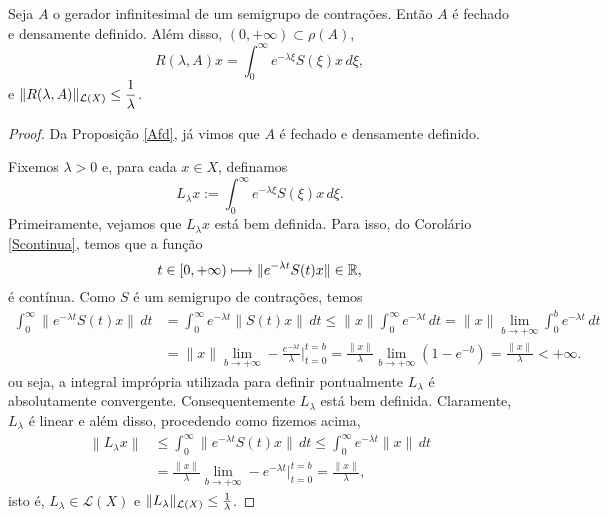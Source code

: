 \begin{lemma}
Seja $A$ o gerador infinitesimal de um semigrupo de contrações. Então $A$ é fechado e densamente definido. Além disso, $(0,+\infty)\subset \rho(A)$, 
\[R(\lambda,A)x=\displaystyle\int_0^\infty e^{-\lambda \xi}S(\xi)x\, d\xi,\] 
e $\|R(\lambda, A)\|_{\mathcal{L}(X)}\leq \displaystyle\frac{1}{\lambda}$.
\end{lemma}
\begin{proof} Da Proposição \ref{Afd}, já vimos que $A$ é fechado e densamente definido.

Fixemos $\lambda>0$ e, para cada $x\in X$, definamos
\begin{equation*}
L_\lambda x :=\int_0^\infty e^{-\lambda \xi}S(\xi)x\, d\xi.
\end{equation*}
Primeiramente, vejamos que $L_\lambda x$ {está bem definida.} 
Para isso, %
do Corolário \ref{Scontinua}, temos que a função
\begin{equation*}
t \in [0,+\infty) \longmapsto
\| e^{-\lambda t}S(t)x\|\in  \mathbb{R},
\end{equation*}
é contínua. 
Como $S$ é um semigrupo de contrações, temos
\begin{align*}
\int_0^\infty \|e^{-\lambda t}S(t)x\|\,dt& =
\int_0^\infty e^{-\lambda t}\|S(t)x\|\,dt\leq\|x\|
 \int_0^\infty e^{-\lambda t}\, dt =\|x\|\lim_{b\to +\infty} \int_0^b e^{-\lambda t}\, dt\\
& =\|x\|\lim_{b\to +\infty}-\frac{e^{-\lambda t}}{\lambda}\Big\vert_{t=0}^{t=b} =\frac{\|x\|}{\lambda}\lim_{b\to +\infty}\left(1-e^{-b}\right)=\frac{\|x\|}{\lambda}<+\infty.
\end{align*}
ou seja, a integral imprópria  utilizada para definir pontualmente $L_{\lambda}$ é absolutamente convergente. Consequentemente $L_\lambda$ está bem definida. Claramente, $L_\lambda$ é linear e além disso, procedendo como fizemos acima, 
\begin{align*}
\left\|L_\lambda x\right\|& \leq \int_0^\infty\|e^{-\lambda t}S(t)x\|\,dt\leq
\int_0^\infty e^{-\lambda t}\|x\|\,dt\\
& = \frac{\|x\|}{\lambda}\lim_{b\to +\infty}-e^{-\lambda t}\Big\vert_{t=0}^{t=b}
=\frac{\|x\|}{\lambda},
\end{align*}
isto é, $L_\lambda \in \mathcal L (X)$ e 
$\|L_\lambda\|_{\mathcal{L}(X)}\leq \frac{1}{\lambda}$.


\end{proof}
